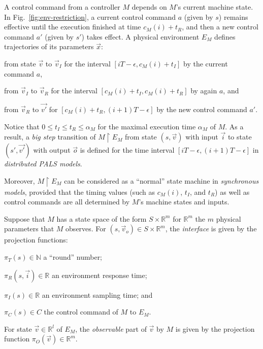 A control command from a controller $M$ depends on $M$'s current 
machine state.
In Fig.~\ref{fig:env-restriction}, a current control command $a$ (given by $s$) remains effective 
until the execution finished at time $c_M(i) + t_R$,
and then a new control command $a'$ (given by $s'$) takes effect.
A physical environment 
$E_M$ defines trajectories of its parameters $\vec{x}$:
\begin{inparaenum}[(i)]
    \item from state $\vec{v}$ to $\vec{v}_I$ for the interval $[iT - \epsilon, c_M(i) + t_I]$ by the current command $a$,
    \item from $\vec{v}_I$ to $\vec{v}_R$ for the interval $[c_M(i) + t_I, c_M(i) + t_R]$ by again $a$, and 
    \item from $\vec{v}_R$ to $\vec{v'}$ for $[c_M(i) + t_R, (i+1)T-\epsilon]$ by the new control command $a'$.
\end{inparaenum}
Notice that $0 \leq t_I \leq t_R \leq \alpha_M$ for the maximal execution time $\alpha_M$  of $M$.
As a result,
a \emph{big step} transition of $M \restriction E_M$ from state $(s, \vec{v})$ with input $\vec{i}$ 
to state $(s',\vec{v'})$ with output $\vec{o}$
is defined for the time interval $[iT - \epsilon, (i+1)T-\epsilon]$ in \emph{distributed PALS models}.

Moreover, $M \restriction E_M$ 
can be considered as a ``normal'' state machine
in \emph{synchronous models},
provided that the timing values (such as $c_M(i)$, $t_I$, and $t_R$)
as well as control commands are all determined by $M$'s machine states and inputs.


\begin{definition}
\label{def:env-interface}
Suppose that $M$ has a state space of the form
$S\times \mathbb{R}^m$  for $\mathbb{R}^m$ the $m$ physical parameters that $M$ observes.   
For $(s,\vec{v}_o) \in S \times \mathbb{R}^m$,
the \emph{interface}  is given by the projection functions:
\begin{inparaenum}[(i)]
        \item $\pi_T(s) \in \mathbb{N}$ a ``round'' number; 
        \item $\pi_R(s,\vec{i}) \in \mathbb{R}$ an environment response time;
        \item $\pi_I(s) \in \mathbb{R}$ an environment sampling time;
        and    
        \item $\pi_C(s) \in C$ the control command of $M$  to $E_M$.
\end{inparaenum}
For state $\vec{v} \in \mathbb{R}^l$ of $E_M$,  
the \emph{observable} part of $\vec{v}$ by $M$
is given by the projection function 
$\pi_O(\vec{v}) \in \mathbb{R}^{m}$.
\end{definition}



